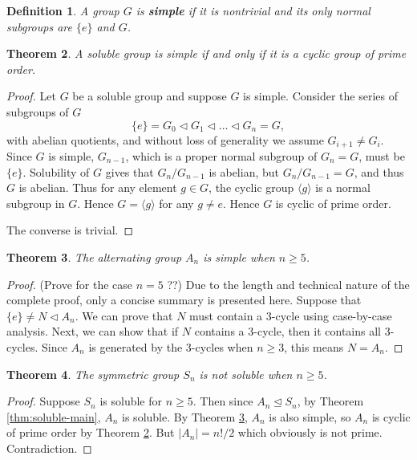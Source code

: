 \documentclass[12pt]{article}
\newtheorem{theorem}{Theorem}
\newtheorem{definition}[theorem]{Definition}
\begin{document}
\begin{definition}
    A group $G$ is \textbf{simple} if it is nontrivial and its only normal subgroups are $\{ e \}$ and $G$. 
\end{definition}

\begin{theorem} \label{thm:soluble-and-simple}
    A soluble group is simple if and only if it is a cyclic group of prime order.
\end{theorem}

\begin{proof}
    Let $G$ be a soluble group and suppose $G$ is simple. Consider the series of subgroups of $G$
$$
\{ e \}=G_0 \triangleleft G_1 \triangleleft \ldots \triangleleft G_n=G,
$$
with abelian quotients, and without loss of generality we assume $G_{i+1} \neq G_i$. Since $G$ is simple, $G_{n-1}$, which is a proper normal subgroup of $G_n = G$, must be $\{ e \}$. Solubility of $G$ gives that $G_n / G_{n -1 }$ is abelian, but $G_n / G_{n - 1} = G$, and thus $G$ is abelian. Thus for any element $g \in G$, the cyclic group $\langle g\rangle$ is a normal subgroup in $G$. Hence  $G = \langle g\rangle$ for any $g \neq e$. Hence $G$ is cyclic of prime order.

The converse is trivial.
\end{proof}


\begin{theorem} \label{thm:simple-alternating}
    The alternating group $A_n$ is simple when $n \ge 5$. 
\end{theorem}

\begin{proof}
    (Prove for the case $n=5$ ??) Due to the length and technical nature of the complete proof, only a concise summary is presented here. 
    Suppose that $\{ e \} \neq N \triangleleft A_n$. We can prove that $N$ must contain a $3$-cycle using case-by-case analysis. Next, we can show that if $N$ contains a $3$-cycle, then it contains all $3$-cycles. Since $A_n$ is generated by the $3$-cycles when $n \ge 3$, this means $N = A_n$.
\end{proof}

\begin{theorem} \label{thm:symmetric-not-soluble}
    The symmetric group $S_n$ is not soluble when $n \ge 5$. 
\end{theorem}

\begin{proof}
    Suppose $S_n$ is soluble for $n \ge 5$. Then since $A_n \trianglelefteq S_n$, by Theorem \ref{thm:soluble-main}, $A_n$ is soluble. By Theorem \ref{thm:simple-alternating}, $A_n$ is also simple, so $A_n$ is cyclic of prime order by Theorem \ref{thm:soluble-and-simple}. But $|A_n| = n! / 2$ which obviously is not prime. Contradiction.
\end{proof}
\end{document}
